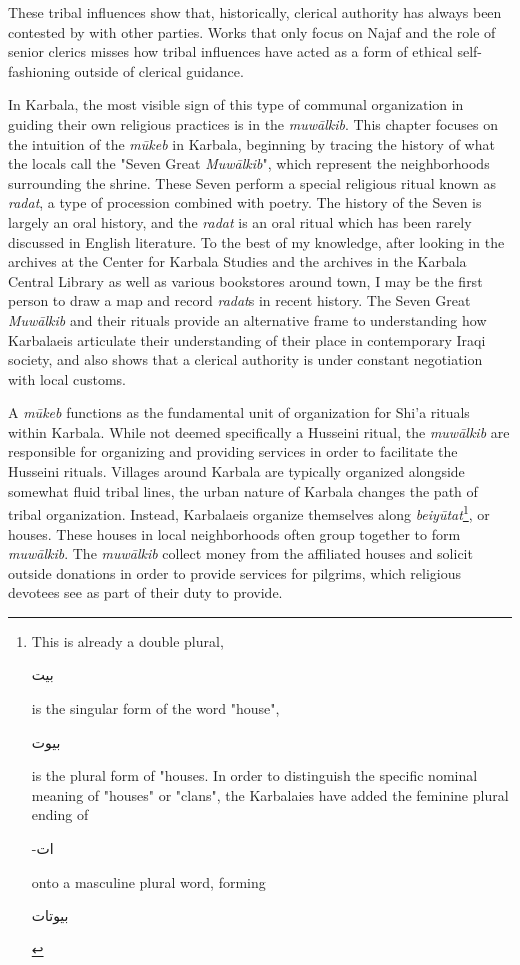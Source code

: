 These tribal influences show that, historically, clerical authority has always been contested by with other parties. Works that only focus on Najaf and the role of senior clerics misses how tribal influences have acted as a form of ethical self-fashioning outside of clerical guidance. 

In Karbala, the most visible sign of this type of communal organization in guiding their own religious practices is in the \emph{muwālkib}. This chapter focuses on the intuition of the \emph{mūkeb} in Karbala, beginning by tracing the history of what the locals call the "Seven Great \emph{Muwālkib}", which represent the neighborhoods surrounding the shrine. These Seven perform a special religious ritual known as \emph{radat}, a type of procession combined with poetry. The history of the Seven is largely an oral history, and the \emph{radat} is an oral ritual which has been rarely discussed in English literature. To the best of my knowledge, after looking in the archives at the Center for Karbala Studies and the archives in the Karbala Central Library as well as various bookstores around town, I may be the first person to draw a map and record \emph{radat}s in recent history. The Seven Great \emph{Muwālkib} and their rituals provide an alternative frame to understanding how Karbalaeis articulate their understanding of their place in contemporary Iraqi society, and also shows that a clerical authority is under constant negotiation with local customs. 

A \emph{mūkeb} functions as the fundamental unit of organization for Shi’a rituals within Karbala. While not deemed specifically a Husseini ritual, the \emph{muwālkib} are responsible for organizing and providing services in order to facilitate the Husseini rituals. Villages around Karbala are typically organized alongside somewhat fluid tribal lines, the urban nature of Karbala changes the path of tribal organization. Instead, Karbalaeis organize themselves along \emph{beiyūtat}\footnote{This is already a double plural, \begin{Arabic}بيت\end{Arabic} is the singular form of the word "house", \begin{Arabic}
    بيوت
\end{Arabic} is the plural form of "houses. In order to distinguish the specific nominal meaning of "houses" or "clans", the Karbalaies have added the feminine plural ending of \begin{Arabic}
    -ات
\end{Arabic} onto a masculine plural word, forming \begin{Arabic}
    بيوتات
\end{Arabic}}, or houses. These houses in local neighborhoods often group together to form \emph{muwālkib}. The \emph{muwālkib} collect money from the affiliated houses and solicit outside donations in order to provide services for pilgrims, which religious devotees see as part of their duty to provide. 

